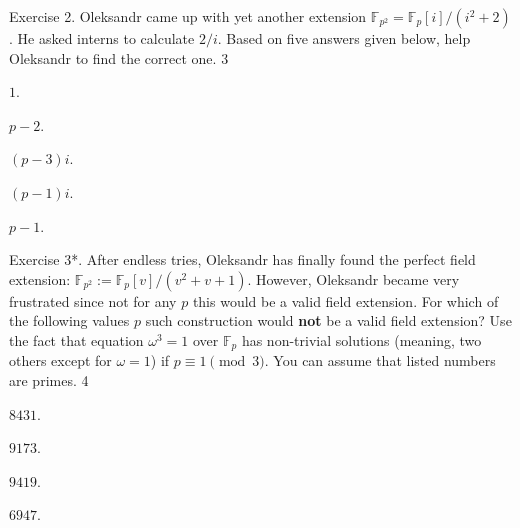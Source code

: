 \documentclass[../lecture-notes-148x210.tex]{subfiles}
\begin{document}
\begin{xexercise}
    {Exercise 2.}
    {Oleksandr came up with yet another extension $\mathbb{F}_{p^2} = \mathbb{F}_p[i]/(i^2+2)$. He asked interns to calculate $2/i$. Based on five answers given below, help Oleksandr to find the correct one.}
    {3}
    {
        \item $1$.
        \item $p-2$.
        \item $(p-3)i$.
        \item $(p-1)i$.
        \item $p-1$.
    }
\end{xexercise}

\begin{xexercise}
    {Exercise 3*.}
    {After endless tries, Oleksandr has finally found the perfect field extension: $\mathbb{F}_{p^2} := \mathbb{F}_p[v] / (v^2+v+1)$. However, Oleksandr became very frustrated since not for any $p$ this would be a valid field extension. For which of the following values $p$ such construction would \textbf{not} be a valid field extension? Use the fact that equation $\omega^3=1$ over $\mathbb{F}_p$ has non-trivial solutions (meaning, two others except for $\omega=1$) if $p \equiv 1 \pmod{3}$. You can assume that listed numbers are primes.}
    {4}
    {
        \item $8431$.
        \item $9173$.
        \item $9419$.
        \item $6947$.
    }
\end{xexercise}
\end{document}
